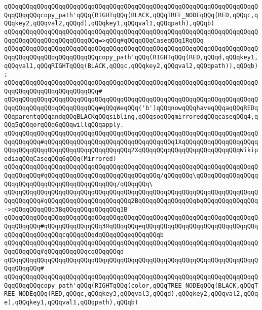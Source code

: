 \verb|qQQqqQQqqQQqqQQqqQQqqQQqqQQqqQQqqQQqqQQqqQQqqQQqqQQqqQQqqQQqqQQqqQQqqQQqqQQqqQQqcopy_path'qQQq(RIGHTqQQq(BLACK,qQQqTREE_NODEqQQq(RED,qQQqc,qQQqkey2,qQQqval2,qQQqd),qQQqkey1,qQQqval1,qQQqpath),qQQqb)|\newline
\verb|qQQqqQQqqQQqqQQqqQQqqQQqqQQqqQQqqQQqqQQqqQQqqQQqqQQqqQQqqQQqqQQqqQQqqQQqqQQqqQQqqQQqqQQqqQQqqQQq=>qQQq#qQQqqQQqCaseqQQq1RqQQq|\newline
\verb|qQQqqQQqqQQqqQQqqQQqqQQqqQQqqQQqqQQqqQQqqQQqqQQqqQQqqQQqqQQqqQQqqQQqqQQqqQQqqQQqqQQqqQQqqQQqqQQqcopy_path'qQQq(RIGHTqQQq(RED,qQQqd,qQQqkey1,qQQqval1,qQQqRIGHTqQQq(BLACK,qQQqc,qQQqkey2,qQQqval2,qQQqpath)),qQQqb);|\newline
\verb|qQQqqQQqqQQqqQQqqQQqqQQqqQQqqQQqqQQqqQQqqQQqqQQqqQQqqQQqqQQqqQQqqQQqqQQqqQQqqQQqqQQqqQQqqQQqqQQq#|\newline
\verb|qQQqqQQqqQQqqQQqqQQqqQQqqQQqqQQqqQQqqQQqqQQqqQQqqQQqqQQqqQQqqQQqqQQqqQQqqQQqqQQqqQQqqQQqqQQqqQQq#qQQqWeqQQq('b')qQQqnowqQQqhaveqQQqaqQQqREDqQQqparentqQQqandqQQqBLACKqQQqsibling,qQQqsoqQQqmirroredqQQqcaseqQQq4,qQQq5qQQqorqQQq6qQQqwillqQQqapply.|\newline
\newline
\verb|qQQqqQQqqQQqqQQqqQQqqQQqqQQqqQQqqQQqqQQqqQQqqQQqqQQqqQQqqQQqqQQqqQQqqQQqqQQqqQQq#qQQqqQQqqQQqqQQqqQQqqQQqqQQqqQQqqQQq1XqQQqqQQqqQQqqQQqqQQqqQQqqQQqqQQqqQQqqQQqqQQqqQQqqQQqqQQq2XqQQqqQQqqQQqqQQqqQQqqQQqqQQqWikipediaqQQqCaseqQQq6qQQq(Mirrored)|\newline
\verb|qQQqqQQqqQQqqQQqqQQqqQQqqQQqqQQqqQQqqQQqqQQqqQQqqQQqqQQqqQQqqQQqqQQqqQQqqQQqqQQq#qQQqqQQqqQQqqQQqqQQqqQQqqQQqqQQq/qQQqqQQq\qQQqqQQqqQQqqQQqqQQqqQQqqQQqqQQqqQQqqQQqqQQqqQQq/qQQqqQQq\|\newline
\verb|qQQqqQQqqQQqqQQqqQQqqQQqqQQqqQQqqQQqqQQqqQQqqQQqqQQqqQQqqQQqqQQqqQQqqQQqqQQqqQQq#qQQqqQQqqQQqqQQqqQQqqQQq2BqQQqqQQqqQQqqQQqbqQQqqQQqqQQqqQQq->qQQqqQQqqQQq3BqQQqqQQqqQQqqQQq1B|\newline
\verb|qQQqqQQqqQQqqQQqqQQqqQQqqQQqqQQqqQQqqQQqqQQqqQQqqQQqqQQqqQQqqQQqqQQqqQQqqQQqqQQq#qQQqqQQqqQQqqQQq3RqQQqqQQqeqQQqqQQqqQQqqQQqqQQqqQQqqQQqqQQqqQQqqQQqqQQqqQQqcqQQqqQQqdqQQqqQQqeqQQqqQQqb|\newline
\verb|qQQqqQQqqQQqqQQqqQQqqQQqqQQqqQQqqQQqqQQqqQQqqQQqqQQqqQQqqQQqqQQqqQQqqQQqqQQqqQQq#qQQqqQQqqQQqcqQQqqQQqd|\newline
\verb|qQQqqQQqqQQqqQQqqQQqqQQqqQQqqQQqqQQqqQQqqQQqqQQqqQQqqQQqqQQqqQQqqQQqqQQqqQQqqQQq#|\newline
\verb|qQQqqQQqqQQqqQQqqQQqqQQqqQQqqQQqqQQqqQQqqQQqqQQqqQQqqQQqqQQqqQQqqQQqqQQqqQQqqQQqcopy_path'qQQq(RIGHTqQQq(color,qQQqTREE_NODEqQQq(BLACK,qQQqTREE_NODEqQQq(RED,qQQqc,qQQqkey3,qQQqval3,qQQqd),qQQqkey2,qQQqval2,qQQqe),qQQqkey1,qQQqval1,qQQqpath),qQQqb)|\newline
